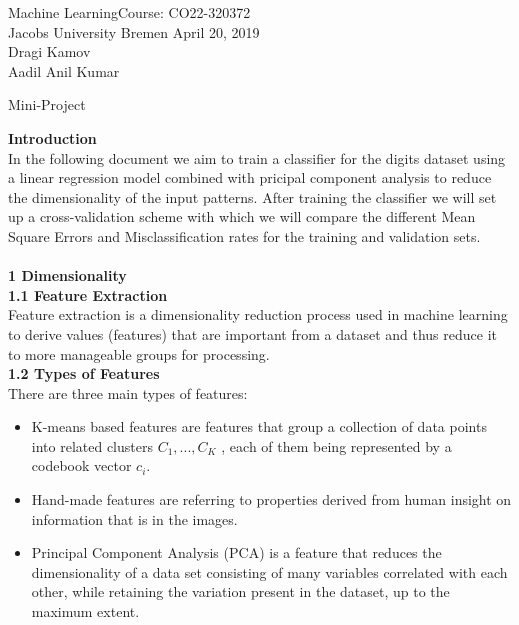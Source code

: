 \documentclass[a4paper]{article}
\newcommand{\coursename}{Machine Learning}
\newcommand{\courseno}{CO22-320372}
\newcommand{\sheettitle}{Mini-Project}
\newcommand{\mytoday}{{April 20}, 2019}
\newcounter{assignmentno}
\newcommand{\assignment}{\arabic{assignmentno}}
\begin{document}
\coursename \hfill Course: \courseno\\
Jacobs University Bremen \hfill \mytoday\\
{Dragi Kamov \\
Aadil Anil Kumar}\hfill
\vspace*{0.3cm}\\
\begin{center}
{\Large \sheettitle{} {\assignment}\\}
\end{center}

\textbf{{\Large Introduction}} \\ 

In the following document we aim to train a classifier for the digits dataset using a linear regression model combined with pricipal component analysis to reduce the dimensionality of the input patterns. After training the classifier we will set up a cross-validation scheme with which we will compare the different Mean Square Errors and Misclassification rates for the training and validation sets.  \\ \\ 

\textbf{{\Large 1 Dimensionality}} \\ 

\textbf{{\large 1.1 Feature Extraction}} \\

Feature extraction is a dimensionality reduction process used in machine learning to derive values (features) that are important from a dataset and thus reduce it to more manageable groups for processing. \\

\textbf{{\large 1.2 Types of Features}} \\

There are three main types of features: 
\begin{itemize}
\item K-means based features are features that group a collection of data points into related clusters  $C_1,...,C_K$ , each of them being represented by a codebook vector  $c_i$.
\item Hand-made features are referring to properties derived from human insight on information that is in the images.
\item Principal Component Analysis (PCA) is a feature that reduces the dimensionality of a data set consisting of many variables correlated with each other, while retaining the variation present in the dataset, up to the maximum extent. \\
\end{itemize}
\end{document}
